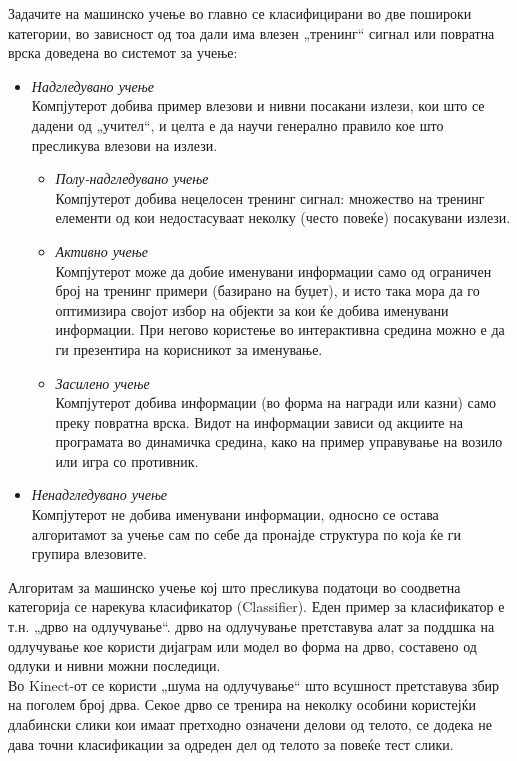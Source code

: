 \documentclass[12pt]{article}
\begin{document}
	Задачите на машинско учење во главно се класифицирани во две пошироки категории, во зависност од тоа дали има влезен „тренинг“ сигнал или повратна врска доведена во системот за учење:

	\begin{itemize}
		\item \textit{Надгледувано учење}\\Компјутерот добива пример влезови и нивни посакани излези, кои што се дадени од „учител“, и целта е да научи генерално правило кое што пресликува влезови на излези.
    \begin{itemize}
      \item \textit{Полу-надгледувано учење}\\Компјутерот добива нецелосен тренинг сигнал: множество на тренинг елементи од кои недостасуваат неколку (често повеќе) посакувани излези.
      \item \textit{Активно учење}\\Компјутерот може да добие именувани информации само од ограничен број на тренинг примери (базирано на буџет), и исто така мора да го оптимизира својот избор на објекти за кои ќе добива именувани информации. При негово користење во интерактивна средина можно е да ги презентира на корисникот за именување.
      \item \textit{Засилено учење}\\Компјутерот добива информации (во форма на награди или казни) само преку повратна врска. Видот на информации зависи од акциите на програмата во динамичка средина, како на пример управување на возило или игра со противник.
      \end{itemize}
		\item \textit{Ненадгледувано учење}\\Компјутерот не добива именувани информации, односно се остава алгоритамот за учење сам по себе да пронајде структура по која ќе ги групира влезовите.
    \end{itemize}

  Алгоритам за машинско учење кој што пресликува податоци во соодветна категорија се нарекува класификатор (Classifier). Еден пример за класификатор е т.н. „дрво на одлучување“. дрво на одлучување претставува алат за поддшка на одлучување кое користи дијаграм или модел во форма на дрво, составено од одлуки и нивни можни последици.\\
  Во Kinect-от се користи „шума на одлучување“ што всушност претставува збир на поголем број дрва. Секое дрво се тренира на неколку особини користејќи длабински слики кои имаат претходно означени делови од телото, се додека не дава точни класификации за одреден дел од телото за повеќе тест слики.
\end{document}
